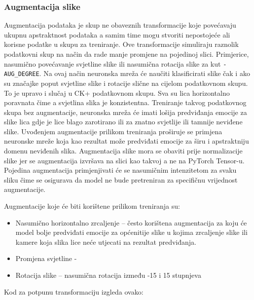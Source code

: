 \documentclass[times, utf8, zavrsni,numeric,pstricks]{fer}
\begin{document}
\subsubsection{Augmentacija slike}


Augmentacija podataka  je skup ne obaveznih transformacije koje povećavaju ukupnu apstraktnost podataka a samim time mogu stvoriti nepostojeće ali korisne podatke u skupu za treniranje. Ove transformacije simuliraju raznolik podatkovni skup na način da rade manje promjene na pojedinoj slici. Primjerice, nasumično povećavanje svjetline slike ili nasumična rotacija slike za kut \lstinline"-AUG_DEGREE". Na ovaj način neuronska mreža će naučiti klasificirati slike čak i ako su značajke poput svjetline slike i rotacije slične na cijelom podatkovnom skupu. To je upravo i slučaj u CK+ podatkovnom skupu. Sva su lica horizontalno poravnata čime a svjetlina slika je konzistentna.  Treniranje takvog podatkovnog skupa bez augmentacije, neuronska mreža će imati lošija predviđanja  emocije za slike lica gdje je lice blago zarotirano ili za znatno svjetlije ili tamnije neviđene slike. Uvođenjem augmentacije prilikom treniranja proširuje se primjena neuronske mreže koja kao rezultat može predviđati emocije za širu i apstraktniju domenu neviđenih slika. Augmentacija slike mora se obaviti prije normalizacije slike jer se augmentacija izvršava na slici kao takvoj a ne na PyTorch Tensor-u. Pojedina augmentacija primjenjivati će se nasumičnim intenzitetom za svaku sliku čime se osigurava da model ne bude pretreniran za specifičnu vrijednost augmentacije. 

 Augmentacije koje će biti korištene prilikom treniranja su:

\begin{itemize}
	\item{Nasumično horizontalno zrcaljenje} – često korištena augmentacija za koju će model bolje predviđati emocije za općenitije slike u kojima zrcaljenje slike ili kamere koja slika lice neće utjecati na rezultat predviđanja.
		
	\item{Promjena svjetline} - 
	
	\item{Rotacija slike} – nasumična rotacija između -15 i 15 stupnjeva
\end{itemize}



\noindent
Kod za potpunu transformaciju izgleda ovako:
\end{document}
